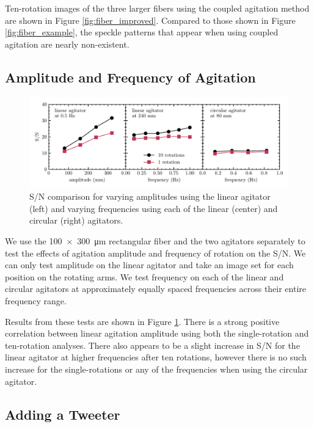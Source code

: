 \documentclass[twocolumn]{emulateapj}
\begin{document}
Ten-rotation images of the three larger fibers using the coupled agitation method are shown in Figure \ref{fig:fiber_improved}. Compared to those shown in Figure \ref{fig:fiber_example}, the speckle patterns that appear when using coupled agitation are nearly non-existent.

\subsection{Amplitude and Frequency of Agitation}
\label{subsec:amp_freq}

\begin{figure}[t]
\centering
	\includegraphics[width=\textwidth]{images/amp_freq_snr.pdf}
	\caption{S/N comparison for varying amplitudes using the linear agitator (left) and varying frequencies using each of the linear (center) and circular (right) agitators.}
\label{fig:amp_freq_snr}
\end{figure}

We use the \SI{100x300}{\micro\meter} rectangular fiber and the two agitators separately to test the effects of agitation amplitude and frequency of rotation on the S/N. We can only test amplitude on the linear agitator and take an image set for each position on the rotating arms. We test frequency on each of the linear and circular agitators at approximately equally spaced frequencies across their entire frequency range.

Results from these tests are shown in Figure \ref{fig:amp_freq_snr}. There is a strong positive correlation between linear agitation amplitude using both the single-rotation and ten-rotation analyses. There also appears to be a slight increase in S/N for the linear agitator at higher frequencies after ten rotations, however there is no such increase for the single-rotations or any of the frequencies when using the circular agitator.

\subsection{Adding a Tweeter}
\end{document}
